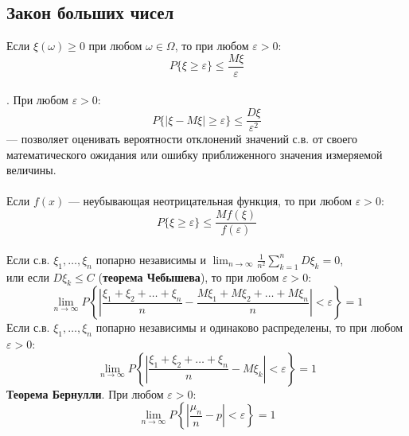 \subsection{Закон больших чисел}
Если $\xi(\omega) \ge 0$ при любом $\omega \in \Omega$, то при любом $\varepsilon > 0$:
\begin{equation*}
    P\{\xi \ge \varepsilon\} \le \frac{M\xi}{\varepsilon}
\end{equation*}
\\
.
При любом $\varepsilon > 0$:
\begin{equation*}
    P\{|\xi - M\xi| \ge \varepsilon\} \le \frac{D\xi}{\varepsilon^2}
\end{equation*}
--- позволяет оценивать вероятности отклонений значений с.в. от своего математического ожидания
или ошибку приближенного значения измеряемой величины.\\
\\
Если $f(x)$ --- неубывающая неотрицательная функция, то при любом $\varepsilon > 0$:
\begin{equation*}
    P\{\xi \ge \varepsilon\} \le \frac{Mf(\xi)}{f(\varepsilon)}
\end{equation*}
\\
Если с.в. $\xi_1, \ldots, \xi_n$ попарно независимы и $\lim_{n\to\infty} \frac{1}{n^2} \sum_{k=1}^n D\xi_k = 0$,\\
или если $D\xi_k \le C$ (\textbf{теорема Чебышева}), то при любом $\varepsilon > 0$:
\begin{equation*}
    \lim_{n\to\infty} P\left\{\left| \frac{\xi_1 + \xi_2 + \ldots + \xi_n}{n} -
    \frac{M\xi_1 + M\xi_2 + \ldots + M\xi_n}{n} \right| < \varepsilon \right\} = 1
\end{equation*}
Если с.в. $\xi_1, \ldots, \xi_n$ попарно независимы и одинаково распределены, то при любом $\varepsilon > 0$:
\begin{equation*}
    \lim_{n\to\infty} P\left\{\left| \frac{\xi_1 + \xi_2 + \ldots + \xi_n}{n} -
    M\xi_k \right| < \varepsilon \right\} = 1
\end{equation*}
\textbf{Теорема Бернулли}.
При любом $\varepsilon > 0$:
\begin{equation*}
    \lim_{n\to\infty} P\left\{\left| \frac{\mu_n}{n} - p \right| < \varepsilon \right\} = 1
\end{equation*}

